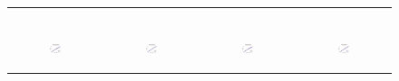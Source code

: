 \begin{figure}[ht]
\begin{tabular}{cccc}
\begin{subfigure}[b]{0.22\textwidth}
			\caption{}
			\label{appfig:partition:runtime_zigzag_setcover}
	  \end{subfigure} \\
	  \begin{subfigure}[b]{0.22\textwidth}
	  	\includegraphics[width=110pt]{images_partition/speedup_erdosrenyi_maxgraphcut.eps}
			\caption{}
			\label{appfig:partition:speedup_erdosrenyi_maxgraphcut}
	  \end{subfigure} &
	  \begin{subfigure}[b]{0.22\textwidth}
	  	\includegraphics[width=110pt]{images_partition/speedup_erdosrenyi_setcover.eps}
			\caption{}
			\label{appfig:partition:speedup_erdosrenyi_setcover}
	  \end{subfigure} &
	  \begin{subfigure}[b]{0.22\textwidth}
	  	\includegraphics[width=110pt]{images_partition/speedup_zigzag_maxgraphcut.eps}
			\caption{}
			\label{appfig:partition:speedup_zigzag_maxgraphcut}
	  \end{subfigure} &
	  \begin{subfigure}[b]{0.22\textwidth}
	  	\includegraphics[width=110pt]{images_partition/speedup_zigzag_setcover.eps}

\end{subfigure}
\end{tabular}
\end{figure}
